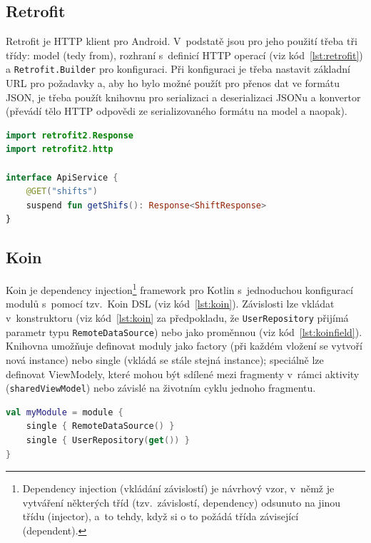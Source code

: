 \documentclass[twoside]{ctuthesis}
\begin{document}
\subsection{Retrofit}
Retrofit je HTTP klient pro Android. V~podstatě jsou pro jeho použití třeba tři třídy: model (tedy from), rozhraní s~definicí HTTP operací (viz kód~\ref{lst:retrofit}) a \texttt{Retrofit.Builder} pro konfiguraci. Při konfiguraci je třeba nastavit základní URL pro požadavky a, aby ho bylo možné použít pro přenos dat ve formátu JSON, je třeba použít knihovnu pro serializaci a deserializaci JSONu a konvertor (převádí tělo HTTP odpovědi ze serializovaného formátu na model a naopak). \cite{kantamani2019understand}

\begin{lstlisting}[language=Kotlin,caption={Definice HTTP operací pro Retrofit},label={lst:retrofit}]
import retrofit2.Response
import retrofit2.http

interface ApiService {
    @GET("shifts")
    suspend fun getShifs(): Response<ShiftResponse>
}
\end{lstlisting}

\subsection{Koin}
Koin \cite{koin2020what} je dependency injection\footnote{Dependency injection (vkládání závislostí) je návrhový vzor, v~němž je vytváření některých tříd (tzv.~závislostí, dependency) odsunuto na jinou třídu (injector), a~to tehdy, když si o to požádá třída závisející (dependent). } framework pro Kotlin s~jednoduchou kon\-fi\-gu\-ra\-cí modulů s~pomocí tzv.~Koin DSL (viz kód~\ref{lst:koin}). Závislosti lze vkládat v~kon\-struk\-to\-ru (viz kód~\ref{lst:koin} za předpokladu, že \texttt{UserRepository} přijímá parametr typu \texttt{RemoteDataSource}) nebo jako proměnnou (viz kód~\ref{lst:koinfield}). Knihovna umožňuje definovat moduly jako factory (při každém vložení se vytvoří nová instance) nebo single (vkládá se stále stejná instance); speciálně lze definovat ViewModely, které mohou být sdílené mezi fragmenty v~rámci aktivity (\texttt{sharedViewModel}) nebo závislé na životním cyklu jednoho fragmentu.


\begin{lstlisting}[language=Kotlin,caption={Definice modulů v Koinu},label={lst:koin}]
val myModule = module {
	single { RemoteDataSource() }
	single { UserRepository(get()) }
}
\end{lstlisting}
\end{document}
